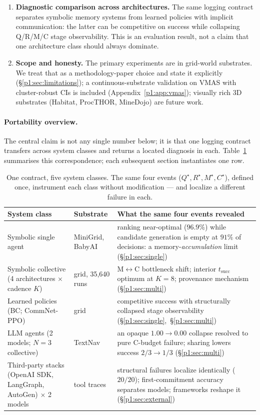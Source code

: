 \documentclass{article}
\begin{document}
\begin{enumerate}[leftmargin=20pt,itemsep=2pt,topsep=2pt]
\item \textbf{Diagnostic comparison across architectures.} The same logging contract separates symbolic memory systems from learned policies with implicit communication: the latter can be competitive on success while collapsing Q/R/M/C stage observability. This is an evaluation result, not a claim that one architecture class should always dominate.

\item \textbf{Scope and honesty.} The primary experiments are in grid-world substrates. We treat that as a methodology-paper choice and state it explicitly (\S\ref{p1:sec:limitations}); a continuous-substrate validation on VMAS with cluster-robust CIs is included (Appendix~\ref{p1:app:vmas}); visually rich 3D substrates (Habitat, ProcTHOR, MineDojo) are future work.
\end{enumerate}

\paragraph{Portability overview.} The central claim is not any single
number below; it is that one logging contract transfers across system
classes and returns a located diagnosis in each.
Table~\ref{p1:tab:portability} summarises this correspondence; each
subsequent section instantiates one row.

\begin{table}[t]
\caption{One contract, five system classes. The same four events
($Q^\star,R^\star,M^\star,C^\star$), defined once, instrument each
class without modification --- and localize a different failure in
each.}
\label{p1:tab:portability}
\centering
\small
\begin{tabular}{p{3.4cm} p{2.6cm} p{6.6cm}}
\toprule
System class & Substrate & What the same four events revealed \\
\midrule
Symbolic single agent & MiniGrid, BabyAI & ranking near-optimal ($96.9\%$) while candidate generation is empty at $91\%$ of decisions: a memory-\emph{accumulation} limit (\S\ref{p1:sec:single}) \\
Symbolic collective (4 architectures $\times$ cadence $K$) & grid, 35{,}640 runs & M$\leftrightarrow$C bottleneck shift; interior $t_{\mathrm{succ}}$ optimum at $K{=}8$; provenance mechanism (\S\ref{p1:sec:multi}) \\
Learned policies (BC; CommNet-PPO) & grid & competitive success with structurally collapsed stage observability (\S\ref{p1:sec:single},~\S\ref{p1:sec:multi}) \\
LLM agents (2 models; $N{=}3$ collective) & TextNav & an opaque $1.00\!\to\!0.00$ collapse resolved to pure C-budget failure; sharing lowers success $2/3\!\to\!1/3$ (\S\ref{p1:sec:multi}) \\
Third-party stacks (OpenAI SDK, LangGraph, AutoGen) $\times$ 2 models & tool traces & structural failures localize identically ($20/20$); first-commitment accuracy separates models; frameworks reshape it (\S\ref{p1:sec:external}) \\
\bottomrule
\end{tabular}
\end{table}
\end{document}
